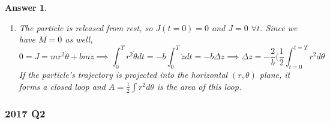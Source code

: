 \documentclass[a4paper]{article}
\newtheorem{ans}{Answer}[section]
\theoremstyle{new}
\begin{document}
\begin{ans}
\begin{enumerate}[label=(\alph*)]
Hence, the following quantity is conserved:
$$J=\frac{\partial\mathcal{L}}{\partial\dot{\theta}_B}+\frac{\partial\mathcal{L}}{\partial\dot{\theta}}+b\frac{\partial\mathcal{L}}{\partial\dot{z}}=M(a^2+b^2)\dot{\theta}_B+mr^2\dot{\theta}+bm\dot{z}$$
\item The particle is released from rest, so $J(t=0)=0$ and $J=0$ $\forall t$. Since we have $M=0$ as well,
$$0=J=mr^2\dot{\theta}+bm\dot{z}\implies\int_0^Tr^2\dot{\theta}dt=-b\int_0^T\dot{z}dt=-b\Delta z\implies\Delta z=-\frac{2}{b}\bigg(\frac{1}{2}\int_{t=0}^{t=T}r^2d\theta$$
If the particle's trajectory is projected into the horizontal $(r,\theta)$ plane, it forms a closed loop and $A=\frac{1}{2}\int r^2d\theta$ is the area of this loop.
\end{enumerate}
\end{ans}
\subsubsection*{2017 Q2}
\end{document}
